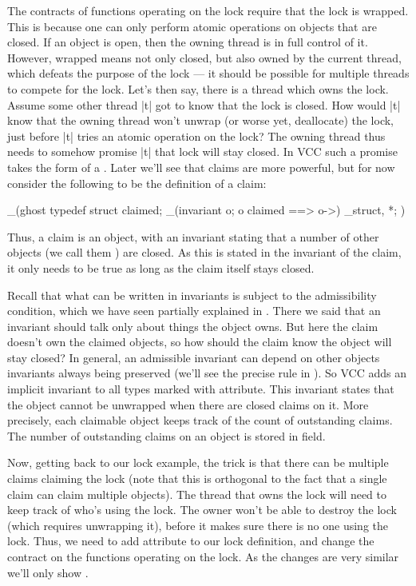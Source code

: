 The contracts of functions operating on the lock require that the lock
is wrapped.
This is because one can only perform atomic operations on objects
that are closed. 
If an object is open, then the owning thread is in full control of it.
However, wrapped means not only closed, but also owned by the current thread,
which defeats the purpose of the lock --- it should be possible
for multiple threads to compete for the lock.
Let's then say, there is a thread which owns the lock.
Assume some other thread \vcc|t| got to know that the lock is closed.
How would \vcc|t| know that the owning thread won't unwrap (or worse yet, deallocate) the lock, just
before \vcc|t| tries an atomic operation on the lock?
The owning thread thus needs to somehow promise \vcc|t|
that lock will stay closed.
In VCC such a promise takes the form of a .
Later we'll see that claims are more powerful, but for
now consider the following to be the definition of a claim:

\begin{VCC}
_(ghost 
typedef struct {
  \ptrset claimed;
  _(invariant \forall \object o; o \in claimed ==> o->\closed)
} \claim_struct, *\claim;
)
\end{VCC}

\noindent
Thus, a claim is an object, with an invariant stating that a number of other objects
(we call them ) are closed.
As this is stated in the invariant of the claim, it only needs to be true
as long as the claim itself stays closed.

Recall that what can be written in invariants is subject to the admissibility
condition, which we have seen partially explained in .
There we said that an invariant should talk only about things the object owns.
But here the claim doesn't own the claimed objects,
so how should the claim know the object will stay closed?
In general, an admissible invariant can depend on other objects invariants always being
preserved (we'll see the precise rule in ).
So VCC adds an implicit invariant to all types
marked with  attribute.
This invariant states that the object cannot be unwrapped when
there are closed claims on it.
More precisely, each claimable object keeps track of the count of outstanding
claims.
The number of outstanding claims on an object is stored in
 field.

Now, getting back to our lock example, the trick is that there can be
multiple claims claiming the lock (note that this is orthogonal to
the fact that a single claim can claim multiple objects).
The thread that owns the lock will need to keep track of who's using
the lock.
The owner won't be able to destroy the lock (which requires unwrapping it),
before it makes sure there is no one using the lock.
Thus, we need to add  attribute to our lock
definition, and change the contract on the functions operating
on the lock. As the changes are very similar we'll only
show .

